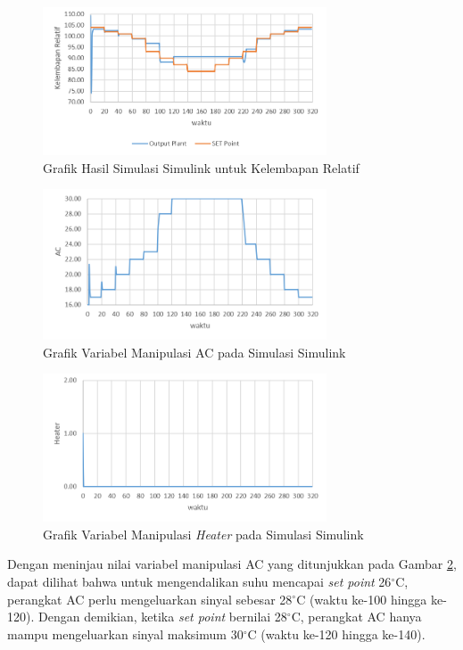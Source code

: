 \begin{figure}[!h]
	\centering
	\includegraphics[width=0.75\textwidth]{figures/SimulinkRH}
	\caption{Grafik Hasil Simulasi Simulink untuk Kelembapan Relatif}
	\label{fig:5:SimulinkRH}
\end{figure}

\begin{figure}[!h]
	\centering
	\includegraphics[width=0.75\textwidth]{figures/SimulinkAC}
	\caption{Grafik Variabel Manipulasi AC pada Simulasi Simulink}
	\label{fig:5:SimulinkAC}
\end{figure}

\begin{figure}[!h]
	\centering
	\includegraphics[width=0.75\textwidth]{figures/SimulinkHT}
	\caption{Grafik Variabel Manipulasi \textit{Heater} pada Simulasi Simulink}
	\label{fig:5:SimulinkHT}
\end{figure}
\vspace{1em}

Dengan meninjau nilai variabel manipulasi AC yang ditunjukkan pada Gambar \ref{fig:5:SimulinkAC}, dapat dilihat bahwa untuk mengendalikan suhu mencapai \textit{set point} 26$^\circ$C, perangkat AC perlu mengeluarkan sinyal sebesar 28$^\circ$C (waktu ke-100 hingga ke-120). Dengan demikian, ketika \textit{set point} bernilai 28$^\circ$C, perangkat AC hanya mampu mengeluarkan sinyal maksimum 30$^\circ$C (waktu ke-120 hingga ke-140).

